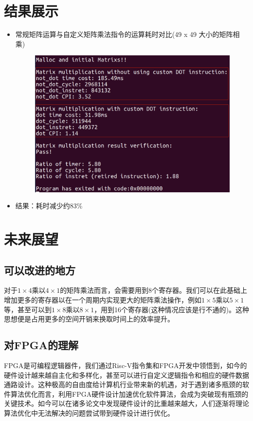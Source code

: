 \documentclass[a4paper, 14pt, oneside]{book} %
\numberwithin{equation}{subsection}
\begin{document}
	\section{结果展示}	
		\begin{itemize}
			\item 
				常规矩阵运算与自定义矩阵乘法指令的运算耗时对比(49 x 49 大小的矩阵相乘)
				\begin{figure}[!htbp]
					\centering
					\includegraphics[scale=0.4]{img/result.png}
				\end{figure}
			\item 
				结果：耗时减少约83\%
		\end{itemize}

	\section{未来展望}
	\subsection{可以改进的地方}
	对于$1\times4$乘以$4\times1$的矩阵乘法而言，会需要用到8个寄存器。我们可以在此基础上增加更多的寄存器以在一个周期内实现更大的矩阵乘法操作，例如$1\times5$乘以$5\times1$等，甚至可以到$1\times8$乘以$8\times1$，用到16个寄存器(这种情况应该是行不通的)。这种思想便是占用更多的空间开销来换取时间上的效率提升。
	
	\subsection{对FPGA的理解}
	FPGA是可编程逻辑器件，我们通过Risc-V指令集和FPGA开发中领悟到，如今的硬件设计越来越自主化和多样化，甚至可以进行自定义逻辑指令和相应的硬件数据通路设计。这种极高的自由度给计算机行业带来新的机遇，对于遇到诸多瓶颈的软件算法优化而言，利用FPGA硬件设计加速优化软件算法，会成为突破现有瓶颈的关键技术。如今可以在诸多论文中发现硬件设计的比重越来越大，人们逐渐将理论算法优化中无法解决的问题尝试带到硬件设计进行优化。
	
	
\end{document}
